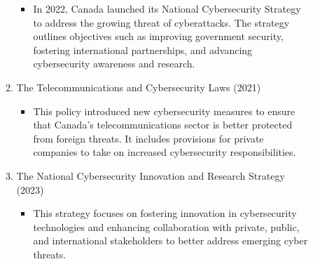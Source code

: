 \begin{enumerate}
\begin{description}
\begin{enumerate}[label=\arabic*., leftmargin=-0.5em]
\begin{itemize}
				\item In 2022, Canada launched its National Cybersecurity Strategy to address the growing threat of cyberattacks.
					The strategy outlines objectives such as improving government security, fostering international partnerships, and advancing cybersecurity awareness and research.
			\end{itemize}
			\item The Telecommunications and Cybersecurity Laws (2021)
			\begin{itemize}
				\item This policy introduced new cybersecurity measures to ensure that Canada’s telecommunications sector is better protected from foreign threats.
					It includes provisions for private companies to take on increased cybersecurity responsibilities.
			\end{itemize}
			\item The National Cybersecurity Innovation and Research Strategy (2023)
			\begin{itemize}
				\item This strategy focuses on fostering innovation in cybersecurity technologies and enhancing collaboration with private, public, and international stakeholders to better address emerging cyber threats.
			\end{itemize}
        \end{enumerate}
    \end{description}
\end{enumerate}